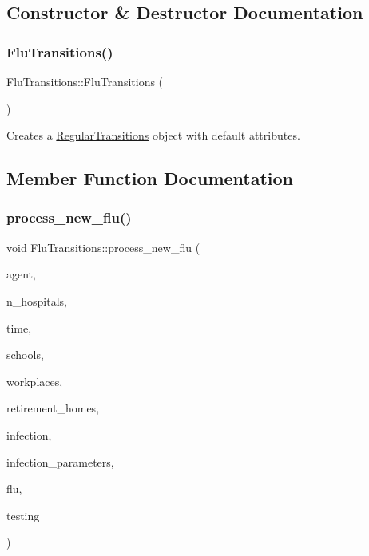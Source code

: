 \subsection{Constructor \& Destructor Documentation}
\mbox{\label{classFluTransitions_a6874addfb6b3cfbf1161fe6d5bc7be16}} 
\subsubsection{\texorpdfstring{Flu\+Transitions()}{FluTransitions()}}
{\footnotesize\ttfamily Flu\+Transitions\+::\+Flu\+Transitions (\begin{DoxyParamCaption}{ }\end{DoxyParamCaption})\hspace{0.3cm}{\ttfamily [default]}}



Creates a \hyperlink{classRegularTransitions}{Regular\+Transitions} object with default attributes. 



\subsection{Member Function Documentation}
\mbox{\label{classFluTransitions_a7e2dec45f840a123bb4418e276674531}} 
\subsubsection{\texorpdfstring{process\+\_\+new\+\_\+flu()}{process\_new\_flu()}}
{\footnotesize\ttfamily void Flu\+Transitions\+::process\+\_\+new\+\_\+flu (\begin{DoxyParamCaption}\item[{\hyperlink{classAgent}{Agent} \&}]{agent,  }\item[{const int}]{n\+\_\+hospitals,  }\item[{const double}]{time,  }\item[{std\+::vector$<$ \hyperlink{classSchool}{School} $>$ \&}]{schools,  }\item[{std\+::vector$<$ \hyperlink{classWorkplace}{Workplace} $>$ \&}]{workplaces,  }\item[{std\+::vector$<$ \hyperlink{classRetirementHome}{Retirement\+Home} $>$ \&}]{retirement\+\_\+homes,  }\item[{\hyperlink{classInfection}{Infection} \&}]{infection,  }\item[{const std\+::map$<$ std\+::string, double $>$ \&}]{infection\+\_\+parameters,  }\item[{\hyperlink{classFlu}{Flu} \&}]{flu,  }\item[{const \hyperlink{classTesting}{Testing} \&}]{testing }\end{DoxyParamCaption})}




